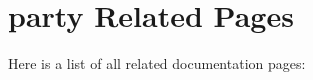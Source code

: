 \section{party Related Pages}
Here is a list of all related documentation pages:\begin{CompactList}
\item {}

\end{CompactList}

